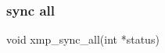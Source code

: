 








\subsubsection{sync all}

\begin{XCexample}
void xmp_sync_all(int *status)
\end{XCexample}

